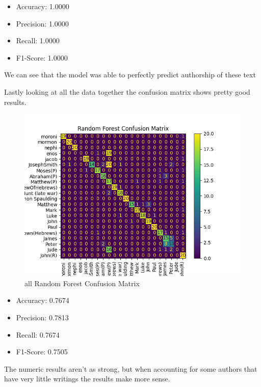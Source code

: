 \documentclass[
  letterpaper,
  DIV=11,
  numbers=noendperiod]{scrartcl}
\providecommand{\tightlist}{%
  \setlength{\itemsep}{0pt}\setlength{\parskip}{0pt}}\usepackage{longtable,booktabs,array}
\begin{document}
\begin{itemize}
\tightlist
\item
  Accuracy: 1.0000
\item
  Precision: 1.0000
\item
  Recall: 1.0000
\item
  F1-Score: 1.0000
\end{itemize}

We can see that the model was able to perfectly predict authorship of
these text

Lastly looking at all the data together the confusion matrix shows
pretty good results.

\begin{figure}

{\centering \includegraphics{Graphs/all/rf.png}

}

\caption{all Random Forest Confusion Matrix}

\end{figure}

\begin{itemize}
\tightlist
\item
  Accuracy: 0.7674
\item
  Precision: 0.7813
\item
  Recall: 0.7674
\item
  F1-Score: 0.7505
\end{itemize}

The numeric results aren't as strong, but when accounting for some
authors that have very little writings the results make more sense.
\end{document}
